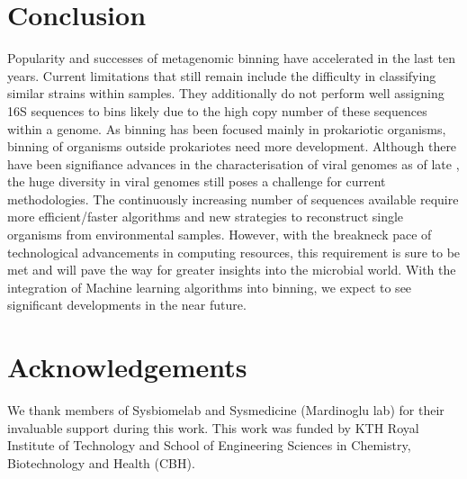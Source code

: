 \documentclass{article}
\begin{document}
\section{Conclusion}
Popularity and successes of metagenomic binning have accelerated in the last ten years.
Current limitations that still remain include the difficulty in classifying similar strains within samples.
They additionally do not perform well assigning 16S sequences to bins likely due to the high copy number of these sequences within a genome.
As binning has been focused mainly in prokariotic organisms, binning of organisms outside prokariotes need more development.
Although there have been signifiance advances in the characterisation of viral genomes as of late \cite{nayfach2021metagenomic}, the huge diversity in viral genomes still poses a challenge for current methodologies.
The continuously increasing number of sequences available require more efficient/faster algorithms and new strategies to reconstruct single organisms from environmental samples.
However, with the breakneck pace of technological advancements in computing resources, this requirement is sure to be met and will pave the way for greater insights into the microbial world.
With the integration of Machine learning algorithms into binning, we expect to see significant developments in the near future.


\section{Acknowledgements}
We thank members of Sysbiomelab and Sysmedicine (Mardinoglu lab) for their invaluable support during this work. This work was funded by KTH Royal Institute of Technology and School of Engineering Sciences in Chemistry,
Biotechnology and Health (CBH).
\end{document}
